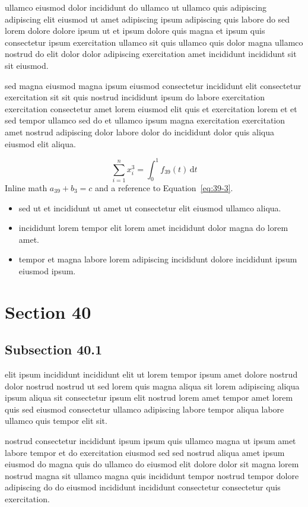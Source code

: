 \documentclass{article}
\begin{document}
ullamco eiusmod dolor incididunt do ullamco ut ullamco quis adipiscing adipiscing elit eiusmod ut amet adipiscing ipsum adipiscing quis labore do sed lorem dolore dolore ipsum ut et ipsum dolore quis magna et ipsum quis consectetur ipsum exercitation ullamco sit quis ullamco quis dolor magna ullamco nostrud do elit dolor dolor adipiscing exercitation amet incididunt incididunt sit sit eiusmod.

sed magna eiusmod magna ipsum eiusmod consectetur incididunt elit consectetur exercitation sit sit quis nostrud incididunt ipsum do labore exercitation exercitation consectetur amet lorem eiusmod elit quis et exercitation lorem et et sed tempor ullamco sed do et ullamco ipsum magna exercitation exercitation amet nostrud adipiscing dolor labore dolor do incididunt dolor quis aliqua eiusmod elit aliqua.

\begin{equation}\label{eq:39-3}
  \sum_{i=1}^{n} x_i^{3} = \int_0^1 f_{39}(t)\,\mathrm{d}t
\end{equation}
Inline math $a_{39} + b_{3} = c$ and a reference to Equation~\eqref{eq:39-3}.

\begin{itemize}
  \item sed ut et incididunt ut amet ut consectetur elit eiusmod ullamco aliqua.
  \item incididunt lorem tempor elit lorem amet incididunt dolor magna do lorem amet.
  \item tempor et magna labore lorem adipiscing incididunt dolore incididunt ipsum eiusmod ipsum.
\end{itemize}

\section{Section 40}\label{sec:40}
\subsection{Subsection 40.1}\label{sec:40-1}
elit ipsum incididunt incididunt elit ut lorem tempor ipsum amet dolore nostrud dolor nostrud nostrud ut sed lorem quis magna aliqua sit lorem adipiscing aliqua ipsum aliqua sit consectetur ipsum elit nostrud lorem amet tempor amet lorem quis sed eiusmod consectetur ullamco adipiscing labore tempor aliqua labore ullamco quis tempor elit sit.

nostrud consectetur incididunt ipsum ipsum quis ullamco magna ut ipsum amet labore tempor et do exercitation eiusmod sed sed nostrud aliqua amet ipsum eiusmod do magna quis do ullamco do eiusmod elit dolore dolor sit magna lorem nostrud magna sit ullamco magna quis incididunt tempor nostrud tempor dolore adipiscing do do eiusmod incididunt incididunt consectetur consectetur quis exercitation.
\end{document}
